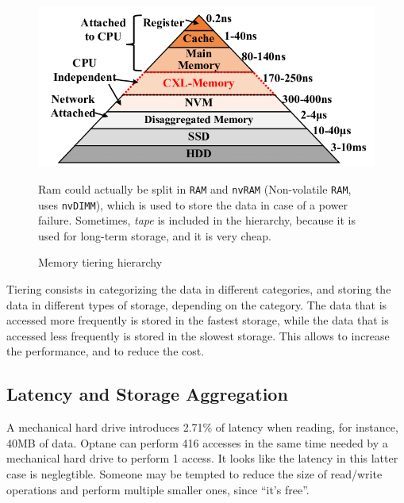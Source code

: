 \begin{figure}[htbp]
   \centering
   \includegraphics{images/tiering_memory.png}
   \caption{Memory tiering hierarchy}
   Ram could actually be split in \texttt{RAM} and \texttt{nvRAM} (Non-volatile \texttt{RAM}, uses \texttt{nvDIMM}), which is used to store the data in case of a power failure.
   Sometimes, \textit{tape} is included in the hierarchy, because it is used for long-term storage, and it is very cheap.
   \label{fig:tiering_memory}
\end{figure}

Tiering consists in categorizing the data in different categories, and storing the data in different types of storage, depending on the category. The data that is accessed more frequently is stored in the fastest storage, while the data that is accessed less frequently is stored in the slowest storage. This allows to increase the performance, and to reduce the cost. 

\subsection{Latency and Storage Aggregation}
A mechanical hard drive introduces 2.71\% of latency when reading, for instance, 40MB of data.  Optane can perform 416 accesses in the same time needed by a mechanical hard drive to perform 1 access. It looks like the latency in this latter case is neglegtible. Someone may be tempted to reduce the size of read/write operations and perform multiple smaller ones, since ``it's free''. 

